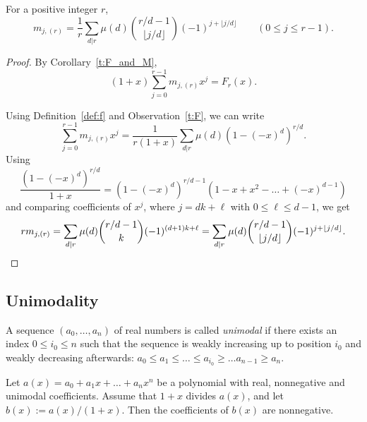 \begin{lemma}\label{t:m_formula}
    For a positive integer $r$,
    \[
		m_{j,(r)}
		= \frac{1}{r} \sum_{d|r} \mu(d) \binom{r/d - 1}{\lfloor j/d \rfloor}  (-1)^{j+\lfloor j/d \rfloor} 
		\qquad (0 \le j \le r-1).
    \]
\end{lemma}
\begin{proof}
	By Corollary~\ref{t:F_and_M},
	\[
	    (1+x) \sum_{j=0}^{r-1} m_{j,(r)}x^j=F_r(x). 
	\]
	
	Using Definition~\ref{def:f} and Observation~\ref{t:F},
	we can write
	\[
	    \sum_{j=0}^{r-1} m_{j,(r)} x^j 
	    = \frac{1}{r(1+x)} \sum_{d|r} \mu(d) (1-(-x)^d)^{r/d}.
    \]
	Using
	\[
		\frac{(1-(-x)^d)^{r/d}}{1+x} 
		= (1-(-x)^d)^{r/d-1} (1 - x + x^2 - \ldots +(-x)^{d-1})
	\]
	and comparing coefficients of $x^j$, where $j = dk + \ell$ with $0 \le \ell \le d-1$, we get
	\[
		r m_{j,(r)}
		= \sum_{d|r} \mu(d) \binom{r/d - 1}{k}  (-1)^{(d+1)k + \ell}
		= \sum_{d|r} \mu(d) \binom{r/d - 1}{\lfloor j/d \rfloor}  (-1)^{j+\lfloor j/d \rfloor}.
        \qedhere
	\]
\end{proof}


\subsection{Unimodality}
\label{sec:unimodality}
	
A sequence $(a_0,\ldots,a_n)$ of real numbers is called {\em unimodal} if there exists an index $0 \le i_0 \le n$ such that the sequence is weakly increasing up to position $i_0$ and weakly decreasing afterwards:
$a_0 \le a_1 \le \ldots \le a_{i_0} \ge \ldots a_{n-1} \ge a_n$.
	
\begin{lemma}\label{t:unimodal}
    Let $a(x) = a_0 + a_1 x + \ldots + a_n x^n$ be a polynomial with real, nonnegative and unimodal coefficients.
    Assume that $1+x$ divides $a(x)$, and let $b(x) := a(x)/(1+x)$.
    Then the coefficients of $b(x)$ are nonnegative.
\end{lemma}
	

